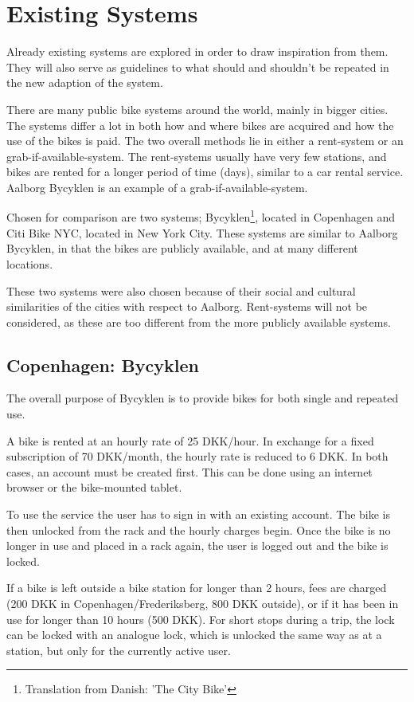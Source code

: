 \section{Existing Systems}

Already existing systems are explored in order to draw inspiration from them.
They will also serve as guidelines to what should and shouldn't be repeated in the new adaption of the system.

There are many public bike systems around the world, mainly in bigger cities.
The systems differ a lot in both how and where bikes are acquired and how the use of the bikes is paid.
The two overall methods lie in either a rent-system or an grab-if-available-system.
The rent-systems usually have very few stations, and bikes are rented for a longer period of time (days), similar to a car rental service.
Aalborg Bycyklen is an example of a grab-if-available-system.

Chosen for comparison are two systems; Bycyklen\footnote{Translation from Danish: 'The City Bike'}, located in Copenhagen and Citi Bike NYC, located in New York City.
These systems are similar to Aalborg Bycyklen, in that the bikes are publicly available, and at many different locations.

These two systems were also chosen because of their social and cultural similarities of the cities with respect to Aalborg.
Rent-systems will not be considered, as these are too different from the more publicly available systems.

\subsection{Copenhagen: Bycyklen}
The overall purpose of Bycyklen\cite{cph_bycyklen}\cite{cph_bycyklen_conditions} is to provide bikes for both single and repeated use.

A bike is rented at an hourly rate of 25 DKK/hour.
In exchange for a fixed subscription of 70 DKK/month, the hourly rate is reduced to 6 DKK.
In both cases, an account must be created first.
This can be done using an internet browser or the bike-mounted tablet.

To use the service the user has to sign in with an existing account.
The bike is then unlocked from the rack and the hourly charges begin.
Once the bike is no longer in use and placed in a rack again, the user is logged out and the bike is locked.

If a bike is left outside a bike station for longer than 2 hours, fees are charged (200 DKK in Copenhagen/Frederiksberg, 800 DKK outside), or if it has been in use for longer than 10 hours (500 DKK).
For short stops during a trip, the lock can be locked with an analogue lock, which is unlocked the same way as at a station, but only for the currently active user.

